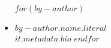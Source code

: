 \begin{itemize}
    $for(by-author)$
    \item[] \textbf{\textsf{$by-author.name.literal$}} \\
    \textsf{$it.metadata.bio$}
    $endfor$
\end{itemize}